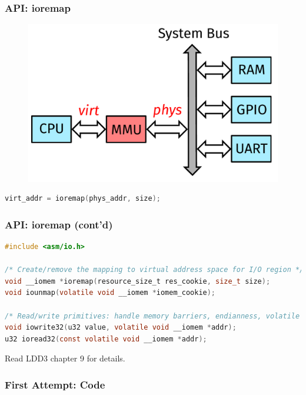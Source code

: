 \documentclass[aspectratio=169,usenames,dvipsnames]{beamer}
\newcounter{cont}
\begin{document}
\begin{frame}[containsverbatim]
  \frametitle{API: ioremap}
  \begin{figure}
    \centering
    \includegraphics[scale=0.3]{images/phys-virt-ioremap.pdf}
  \end{figure}

  \begin{lstlisting}[language=c,numbers=none]
virt_addr = ioremap(phys_addr, size);
  \end{lstlisting}
\end{frame}

\begin{frame}[containsverbatim]
  \frametitle{API: ioremap (cont'd)}
  \begin{lstlisting}[language=c,numbers=none]
#include <asm/io.h>

/* Create/remove the mapping to virtual address space for I/O region */
void __iomem *ioremap(resource_size_t res_cookie, size_t size);
void iounmap(volatile void __iomem *iomem_cookie);

/* Read/write primitives: handle memory barriers, endianness, volatile */
void iowrite32(u32 value, volatile void __iomem *addr);
u32 ioread32(const volatile void __iomem *addr);
  \end{lstlisting}

  Read LDD3 chapter 9 for details.
\end{frame}

\begin{frame}[containsverbatim,allowframebreaks=1]
  \frametitle{First Attempt: Code}
  
\end{frame}
\end{document}
